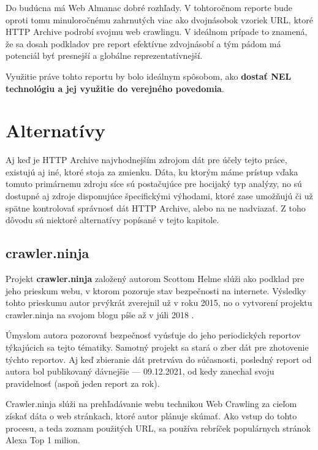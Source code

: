 Do budúcna má Web Almanac dobré rozhľady. V tohtoročnom reporte bude oproti tomu minuloročnému zahrnutých viac ako dvojnásobok vzoriek URL, ktoré HTTP Archive podrobí svojmu web crawlingu.
V ideálnom prípade to znamená, že sa dosah podkladov pre report efektívne zdvojnásobí a tým pádom má potenciál byť presnejší a globálne reprezentatívnejší.

Využitie práve tohto reportu by bolo ideálnym spôsobom, ako \textbf{dostať NEL technológiu a jej využitie do verejného povedomia}.

\section{Alternatívy}
\label{httparchive-alternatives}

Aj keď je HTTP Archive najvhodnejším zdrojom dát pre účely tejto práce, existujú aj iné, ktoré stoja za zmienku.
Dáta, ku ktorým máme prístup vďaka tomuto primárnemu zdroju síce sú postačujúce pre hocijaký typ analýzy, no sú dostupné aj zdroje disponujúce špecifickými výhodami, ktoré
zase umožňujú či už spätne kontrolovať správnosť dát HTTP Archive, alebo na ne nadviazať.
Z toho dôvodu sú niektoré alternatívy popísané v tejto kapitole.

\subsection{crawler.ninja}

Projekt \textbf{crawler.ninja} založený autorom Scottom Helme slúži ako podklad pre jeho prieskum
webu, v ktorom pozoruje stav bezpečnosti na internete. 
Výsledky tohto prieskumu autor prvýkrát zverejnil už v roku 2015, no o vytvorení projektu crawler.ninja na svojom blogu píše až v júli 2018 \cite{crawler-ninja}. 


Úmyslom autora pozorovať bezpečnosť vyúsťuje do jeho periodických reportov týkajúcich sa tejto tématiky. 
Samotný projekt sa stará o zber dát pre zhotovenie týchto reportov.
Aj keď zbieranie dát pretrváva do súčasnosti, posledný report od autora bol publikovaný dávnejšie --- 09.12.2021, od kedy zanechal svoju pravidelnosť (aspoň jeden report za rok).

Crawler.ninja slúži na prehľadávanie webu technikou Web Crawling za cieľom získať dáta o web stránkach, ktoré autor plánuje skúmať.
Ako vstup do tohto procesu, a teda zoznam použitých URL, sa používa rebríček populárnych stránok Alexa Top 1 milion.

